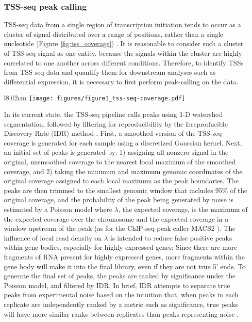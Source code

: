 \documentclass[9pt, letterpaper]{article}
\begin{document}
\subsubsection{TSS-seq peak calling}

TSS-seq data from a single region of transcription initiation tends to occur as a cluster of signal distributed over a range of positions, rather than a single nucleotide (Figure \ref{fig:tss_coverage}) \cite{arribere2013, malabat2015}. It is reasonable to consider such a cluster of TSS-seq signal as one entity, because the signals within the cluster are highly correlated to one another across different conditions. Therefore, to identify TSSs from TSS-seq data and quantify them for downstream analyses such as differential expression, it is necessary to first perform peak-calling on the data.

\begin{wrapfigure}[14]{l}{8.02cm}
\centering
\texttt{[image: figures/figure1\_tss-seq-coverage.pdf]}
\caption{Wild-type sense strand TSS-seq signal at the TEF1 genic TSS. Normalized counts are the mean of spike-in normalized coverage from two replicates.}
\label{fig:tss_coverage}
\end{wrapfigure}

In its current state, the TSS-seq pipeline calls peaks using 1-D watershed segmentation, followed by filtering for reproducibility by the Irreproducible Discovery Rate (IDR) method \cite{li2011}. First, a smoothed version of the TSS-seq coverage is generated for each sample using a discretized Gaussian kernel. Next, an initial set of peaks is generated by: 1) assigning all nonzero signal in the original, unsmoothed coverage to the nearest local maximum of the smoothed coverage, and 2) taking the minimum and maximum genomic coordinates of the original coverage assigned to each local maximum as the peak boundaries. The peaks are then trimmed to the smallest genomic window that includes 95\% of the original coverage, and the probability of the peak being generated by noise is estimated by a Poisson model where $\lambda$, the expected coverage, is the maximum of the expected coverage over the chromosome and the expected coverage in a window upstream of the peak (as for the ChIP-seq peak caller MACS2 \cite{zhang2008}). The influence of local read density on $\lambda$ is intended to reduce false positive peaks within gene bodies, especially for highly expressed genes: Since there are more fragments of RNA present for highly expressed genes, more fragments within the gene body will make it into the final library, even if they are not true 5' ends. To generate the final set of peaks, the peaks are ranked by significance under the Poisson model, and filtered by IDR. In brief, IDR attempts to separate true peaks from experimental noise based on the intuition that, when peaks in each replicate are independently ranked by a metric such as significance, true peaks will have more similar ranks between replicates than peaks representing noise \cite{li2011}.
\end{document}
